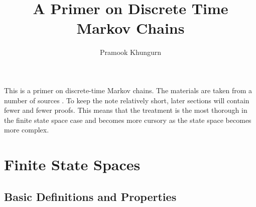 \documentclass[10pt]{article}
\title{A Primer on Discrete Time Markov Chains}
\author{Pramook Khungurn}
\begin{document}
\maketitle

This is a primer on discrete-time Markov chains. The materials are taken from a number of sources \cite{Haggstrom:2002,Lee:2012a,Lee:2012b,Kennedy:2016,Tolver:2016}. To keep the note relatively short, later sections will contain fewer and fewer proofs. This means that the treatment is the most thorough in the finite state space case and becomes more cursory as the state space becomes more complex.

\section{Finite State Spaces}

\subsection{Basic Definitions and Properties}
\end{document}
